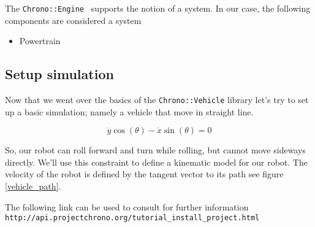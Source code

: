 The \lstinline{Chrono::Engine } supports the notion of a system. In our case, the following components are considered a system

\begin{itemize}
\item Powertrain
\end{itemize}



\subsection{Setup simulation}
Now that we went over the basics of the \lstinline{Chrono::Vehicle} library let's try to set up a basic simulation; namely a vehicle that move in straight line.

\begin{equation}
\dot{y}\cos(\theta) - \dot{x}\sin(\theta) = 0
\end{equation} 


So, our robot can roll forward and turn while rolling, but cannot move sideways directly. We'll use this constraint to define a kinematic model for our robot. The velocity of the robot is defined by the tangent vector to its path see figure \ref{vehicle_path}. 


The following link can be used to consult for further information \lstinline{http://api.projectchrono.org/tutorial_install_project.html}












